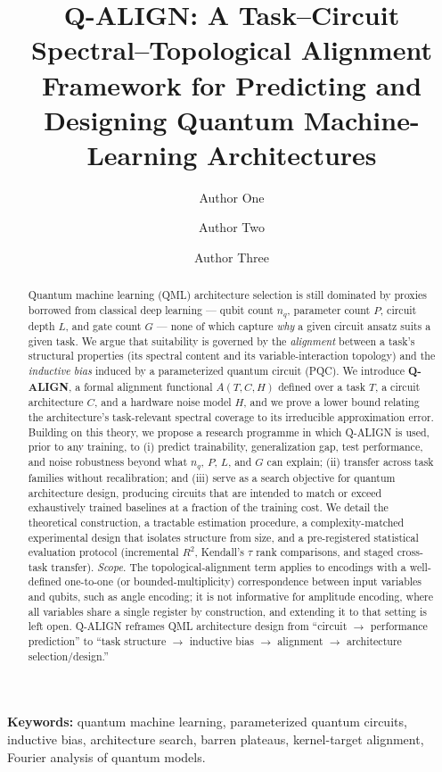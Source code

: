 \documentclass[11pt]{article}
\title{\textbf{Q-ALIGN: A Task--Circuit Spectral--Topological Alignment Framework for Predicting and Designing Quantum Machine-Learning Architectures}}
\author[1]{Author One}
\author[1]{Author Two}
\author[2]{Author Three}
\affil[1]{Department of Computer Science, [Institution], [City, Country]}
\affil[2]{Department of Physics, [Institution], [City, Country]}
\date{}
\begin{document}
\maketitle

\begin{abstract}
Quantum machine learning (QML) architecture selection is still dominated by proxies borrowed from classical deep learning --- qubit count $n_q$, parameter count $P$, circuit depth $L$, and gate count $G$ --- none of which capture \emph{why} a given circuit ansatz suits a given task. We argue that suitability is governed by the \emph{alignment} between a task's structural properties (its spectral content and its variable-interaction topology) and the \emph{inductive bias} induced by a parameterized quantum circuit (PQC). We introduce \textbf{Q-ALIGN}, a formal alignment functional $A(T,C,H)$ defined over a task $T$, a circuit architecture $C$, and a hardware noise model $H$, and we prove a lower bound relating the architecture's task-relevant spectral coverage to its irreducible approximation error. Building on this theory, we propose a research programme in which Q-ALIGN is used, prior to any training, to (i) predict trainability, generalization gap, test performance, and noise robustness beyond what $n_q$, $P$, $L$, and $G$ can explain; (ii) transfer across task families without recalibration; and (iii) serve as a search objective for quantum architecture design, producing circuits that are intended to match or exceed exhaustively trained baselines at a fraction of the training cost. We detail the theoretical construction, a tractable estimation procedure, a complexity-matched experimental design that isolates structure from size, and a pre-registered statistical evaluation protocol (incremental $R^2$, Kendall's $\tau$ rank comparisons, and staged cross-task transfer). \emph{Scope.} The topological-alignment term applies to encodings with a well-defined one-to-one (or bounded-multiplicity) correspondence between input variables and qubits, such as angle encoding; it is not informative for amplitude encoding, where all variables share a single register by construction, and extending it to that setting is left open. Q-ALIGN reframes QML architecture design from ``circuit $\rightarrow$ performance prediction'' to ``task structure $\rightarrow$ inductive bias $\rightarrow$ alignment $\rightarrow$ architecture selection/design.''
\end{abstract}

\noindent\textbf{Keywords:} quantum machine learning, parameterized quantum circuits, inductive bias, architecture search, barren plateaus, kernel-target alignment, Fourier analysis of quantum models.
\end{document}

